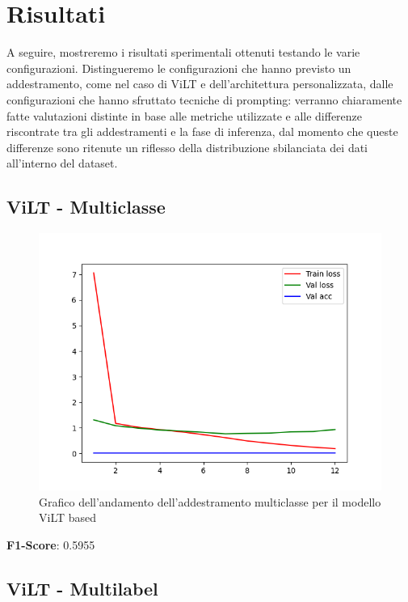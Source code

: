 \documentclass[../main.tex]{subfiles}
\begin{document}
\cite{vedantam2015ciderconsensusbasedimagedescription}

\section{Risultati}

A seguire, mostreremo i risultati sperimentali ottenuti testando le varie configurazioni. 
Distingueremo le configurazioni che hanno previsto un addestramento, come nel caso di ViLT e dell'architettura personalizzata, dalle configurazioni che hanno sfruttato tecniche di prompting: verranno chiaramente fatte valutazioni distinte in base alle metriche utilizzate e alle differenze riscontrate tra gli addestramenti e la fase di inferenza, dal momento che queste differenze sono ritenute un riflesso della distribuzione sbilanciata dei dati all'interno del dataset.

\subsection{ViLT - Multiclasse}

\begin{figure}[H]
    \centering
    \includegraphics[width=1\linewidth]{static//vilt-multiclass/run.png}
    \caption{Grafico dell'andamento dell'addestramento multiclasse per il modello ViLT based}
    \label{fig:enter-label}
\end{figure}

\textbf{F1-Score}: 0.5955

\subsection{ViLT - Multilabel}
\end{document}
